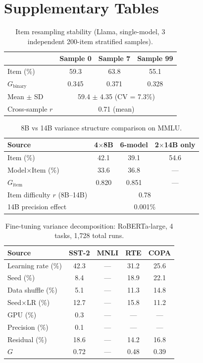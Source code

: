 \documentclass[11pt,letterpaper]{article}
\begin{document}
\section{Supplementary Tables}

\begin{table}[h]
\centering
\caption{Item resampling stability (Llama, single-model, 3 independent 200-item stratified samples).}
\label{tab:resampling}
\small
\begin{tabular}{lccc}
\toprule
& \textbf{Sample 0} & \textbf{Sample 7} & \textbf{Sample 99} \\
\midrule
Item (\%) & 59.3 & 63.8 & 55.1 \\
$G_{\text{binary}}$ & 0.345 & 0.371 & 0.328 \\
\midrule
Mean $\pm$ SD & \multicolumn{3}{c}{59.4 $\pm$ 4.35 (CV = 7.3\%)} \\
Cross-sample $r$ & \multicolumn{3}{c}{0.71 (mean)} \\
\bottomrule
\end{tabular}
\end{table}

\begin{table}[h]
\centering
\caption{8B vs 14B variance structure comparison on MMLU.}
\label{tab:scale}
\small
\begin{tabular}{lccc}
\toprule
\textbf{Source} & \textbf{4$\times$8B} & \textbf{6-model} & \textbf{2$\times$14B only} \\
\midrule
Item (\%)         & 42.1 & 39.1 & 54.6 \\
Model$\times$Item (\%) & 33.6 & 36.8 & --- \\
$G_{\text{item}}$ & 0.820 & 0.851 & --- \\
Item difficulty $r$ (8B--14B) & \multicolumn{3}{c}{0.78} \\
14B precision effect & \multicolumn{3}{c}{0.001\%} \\
\bottomrule
\end{tabular}
\end{table}

\begin{table}[h]
\centering
\caption{Fine-tuning variance decomposition: RoBERTa-large, 4 tasks, 1,728 total runs.}
\label{tab:finetuning}
\small
\begin{tabular}{lcccc}
\toprule
\textbf{Source} & \textbf{SST-2} & \textbf{MNLI} & \textbf{RTE} & \textbf{COPA} \\
\midrule
Learning rate (\%) & 42.3 & --- & 31.2 & 25.6 \\
Seed (\%) & 8.4 & --- & 18.9 & 22.1 \\
Data shuffle (\%) & 5.1 & --- & 11.3 & 14.8 \\
Seed$\times$LR (\%) & 12.7 & --- & 15.8 & 11.2 \\
GPU (\%) & 0.3 & --- & --- & --- \\
Precision (\%) & 0.1 & --- & --- & --- \\
Residual (\%) & 18.6 & --- & 14.2 & 16.8 \\
\midrule
$G$ & 0.72 & --- & 0.48 & 0.39 \\
\bottomrule
\end{tabular}
\end{table}
\end{document}
